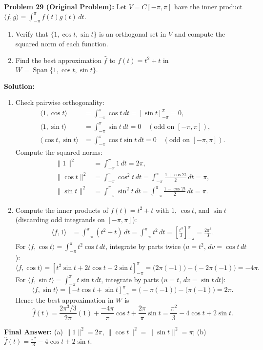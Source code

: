 \documentclass[11pt, letterpaper]{article}
\theoremstyle{definition}
\theoremstyle{remark}
\begin{document}
\medskip

\textbf{Problem 29 (Original Problem):} Let $V = C[-\pi, \pi]$ have the inner product $\langle f, g \rangle = \int_{-\pi}^{\pi} f(t)g(t)\,dt$.
\begin{enumerate}[label=(\alph*)]
    \item Verify that $\{1, \cos t, \sin t\}$ is an orthogonal set in $V$ and compute the squared norm of each function.
    \item Find the best approximation $\hat{f}$ to $f(t) = t^2 + t$ in $W = \operatorname{Span}\{1, \cos t, \sin t\}$.
\end{enumerate}

\textbf{Solution:}
\begin{enumerate}[label=(\alph*)]
    \item Check pairwise orthogonality:
    \begin{align*}
    \langle 1, \cos t \rangle &= \int_{-\pi}^{\pi} \cos t\,dt = \left[\sin t\right]_{-\pi}^{\pi} = 0, \\
    \langle 1, \sin t \rangle &= \int_{-\pi}^{\pi} \sin t\,dt = 0 \quad (\text{odd on } [-\pi, \pi]), \\
    \langle \cos t, \sin t \rangle &= \int_{-\pi}^{\pi} \cos t \sin t\,dt = 0 \quad (\text{odd on } [-\pi, \pi]).
    \end{align*}
    Compute the squared norms:
    \begin{align*}
    \|1\|^2 &= \int_{-\pi}^{\pi} 1\,dt = 2\pi, \\
    \|\cos t\|^2 &= \int_{-\pi}^{\pi} \cos^2 t\,dt = \int_{-\pi}^{\pi} \frac{1 + \cos 2t}{2}\,dt = \pi, \\
    \|\sin t\|^2 &= \int_{-\pi}^{\pi} \sin^2 t\,dt = \int_{-\pi}^{\pi} \frac{1 - \cos 2t}{2}\,dt = \pi.
    \end{align*}
    \item Compute the inner products of $f(t) = t^2 + t$ with $1$, $\cos t$, and $\sin t$ (discarding odd integrands on $[-\pi, \pi]$):
    \begin{align*}
    \langle f, 1 \rangle &= \int_{-\pi}^{\pi} (t^2 + t)\,dt = \int_{-\pi}^{\pi} t^2\,dt = \left[\frac{t^3}{3}\right]_{-\pi}^{\pi} = \frac{2\pi^3}{3}.
    \end{align*}
    For $\langle f, \cos t \rangle = \int_{-\pi}^{\pi} t^2\cos t\,dt$, integrate by parts twice ($u = t^2$, $dv = \cos t\,dt$):
    \[
    \langle f, \cos t \rangle = \left[t^2\sin t + 2t\cos t - 2\sin t\right]_{-\pi}^{\pi} = \big(2\pi(-1)\big) - \big(-2\pi(-1)\big) = -4\pi.
    \]
    For $\langle f, \sin t \rangle = \int_{-\pi}^{\pi} t\sin t\,dt$, integrate by parts ($u = t$, $dv = \sin t\,dt$):
    \[
    \langle f, \sin t \rangle = \left[-t\cos t + \sin t\right]_{-\pi}^{\pi} = \big(-\pi(-1)\big) - \big(\pi(-1)\big) = 2\pi.
    \]
    Hence the best approximation in $W$ is
    \[
    \hat{f}(t) = \frac{2\pi^3/3}{2\pi}(1) + \frac{-4\pi}{\pi}\cos t + \frac{2\pi}{\pi}\sin t = \frac{\pi^2}{3} - 4\cos t + 2\sin t.
    \]
\end{enumerate}
\textbf{Final Answer:} (a) $\|1\|^2 = 2\pi$, $\|\cos t\|^2 = \|\sin t\|^2 = \pi$; (b) $\hat{f}(t) = \frac{\pi^2}{3} - 4\cos t + 2\sin t$.
\end{document}

